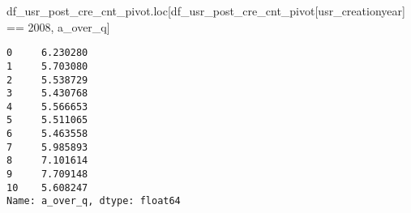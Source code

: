 \documentclass[
  letterpaper,
  DIV=11,
  numbers=noendperiod]{scrartcl}
\newenvironment{Shaded}{\begin{snugshade}}{\end{snugshade}}
\newcommand{\NormalTok}[1]{\textcolor[rgb]{0.00,0.23,0.31}{#1}}
\newcommand{\OperatorTok}[1]{\textcolor[rgb]{0.37,0.37,0.37}{#1}}
\newcommand{\StringTok}[1]{\textcolor[rgb]{0.13,0.47,0.30}{#1}}
\begin{document}
\begin{Shaded}
\begin{Highlighting}[]
\NormalTok{df\_usr\_post\_cre\_cnt\_pivot.loc[df\_usr\_post\_cre\_cnt\_pivot[}\StringTok{\textquotesingle{}usr\_creationyear\textquotesingle{}}\NormalTok{] }\OperatorTok{==} \StringTok{\textquotesingle{}2008\textquotesingle{}}\NormalTok{, }\StringTok{\textquotesingle{}a\_over\_q\textquotesingle{}}\NormalTok{]}
\end{Highlighting}
\end{Shaded}

\begin{verbatim}
0     6.230280
1     5.703080
2     5.538729
3     5.430768
4     5.566653
5     5.511065
6     5.463558
7     5.985893
8     7.101614
9     7.709148
10    5.608247
Name: a_over_q, dtype: float64
\end{verbatim}
\end{document}
